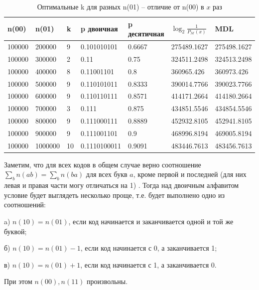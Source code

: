 \documentclass[12pt]{article}
\begin{document}
	\begin{table}[!h]
		\caption{Оптимальные k для разных n(01) -- отличие от n(00) в $x$ раз}
		\label{table:n00n01big}
		\begin{center}
			\begin{tabular}{|l|l|l|l|l|l|l|}
				\hline
				n(00) & n(01) & k & p двоичная & p десятичная & $\log_2{\frac{1}{P_{\mathcal{M}}(x)}}$ & MDL \\
				\hline 
				100000 & 200000 & 9 & 0.101010101 & 0.6667 & 275489.1627 & 275498.1627 \\ 
				\hline 
				100000 & 300000 & 2 & 0.11 & 0.75 & 324511.2498 & 324513.2498 \\ 
				\hline 
				100000 & 400000 & 8 & 0.11001101 & 0.8 & 360965.426 & 360973.426 \\ 
				\hline 
				100000 & 500000 & 9 & 0.110101011 & 0.8333 & 390014.7766 & 390023.7766 \\ 
				\hline 
				100000 & 600000 & 9 & 0.110110111 & 0.8571 & 414171.2664 & 414180.2664 \\ 
				\hline 
				100000 & 700000 & 3 & 0.111 & 0.875 & 434851.5546 & 434854.5546 \\ 
				\hline 
				100000 & 800000 & 9 & 0.111000111 & 0.8889 & 452932.8105 & 452941.8105 \\ 
				\hline 
				100000 & 900000 & 9 & 0.111001101 & 0.9 & 468996.8194 & 469005.8194 \\ 
				\hline 
				100000 & 1000000 & 10 & 0.1110100011 & 0.9091 & 483446.7613 & 483456.7613 \\ 
				\hline 
			\end{tabular}
		\end{center}
	\end{table}
	

	Заметим, что для всех кодов в общем случае верно соотношение $\sum_b n(ab)=\sum_b n(ba)$ для всех букв $a$, кроме первой и последней (для них левая и правая части могу отличаться на 1) \cite[стр.~147]{teor_inf_ver}. Тогда над двоичным алфавитом условие будет выглядеть несколько проще, т.е. будет выполнено одно из соотношений:
	
	a) $n(10)=n(01)$, если код начинается и заканчивается одной и той же буквой;
	
	б) $n(10)=n(01)-1$, если код начинается с 0, а заканчивается 1;
	
	в) $n(10)=n(01)+1$, если код начинается с 1, а заканчивается 0.
	
	При этом $n(00),n(11)$ произвольны.
	
\end{document}
